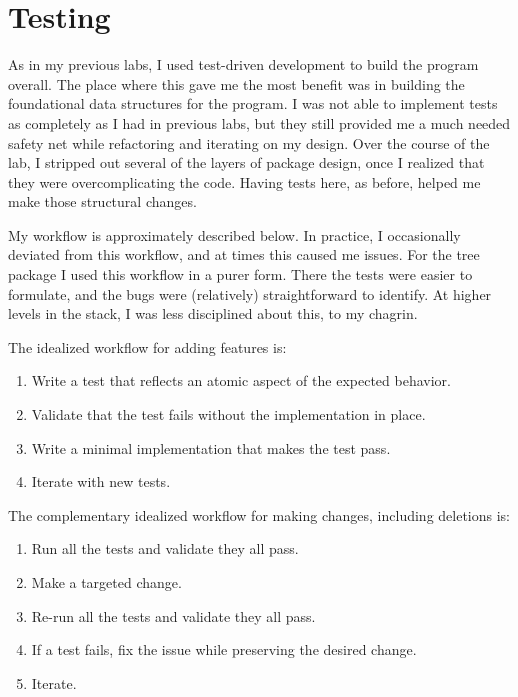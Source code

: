 \documentclass[10pt,letterpaper,final]{report}
\begin{document}
\pagebreak

\section{Testing}\label{sec:testing}

As in my previous labs, I used test-driven development to build the program overall. The place where this gave me the most benefit was in building the foundational data structures for the program. I was not able to implement tests as completely as I had in previous labs, but they still provided me a much needed safety net while refactoring and iterating on my design. Over the course of the lab, I stripped out several of the layers of package design, once I realized that they were overcomplicating the code. Having tests here, as before, helped me make those structural changes.

My workflow is approximately described below. In practice, I occasionally deviated from this workflow, and at times this caused me issues. For the tree package I used this workflow in a purer form. There the tests were easier to formulate, and the bugs were (relatively) straightforward to identify. At higher levels in the stack, I was less disciplined about this, to my chagrin.

\noindent The idealized workflow for adding features is:

\begin{enumerate}
  \item Write a test that reflects an atomic aspect of the expected behavior.
  \item Validate that the test fails without the implementation in place.
  \item Write a minimal implementation that makes the test pass.
  \item Iterate with new tests.
\end{enumerate}

\noindent The complementary idealized workflow for making changes, including deletions is:

\begin{enumerate}
  \item Run all the tests and validate they all pass.
  \item Make a targeted change.
  \item Re-run all the tests and validate they all pass.
  \item If a test fails, fix the issue while preserving the desired change.
  \item Iterate.
\end{enumerate}
\end{document}
